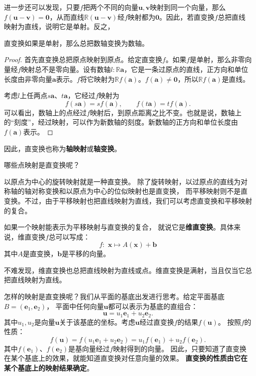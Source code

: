 \documentclass[12pt,UTF8,fontset=none]{ctexbook}
\begin{document}
进一步还可以发现，只要$f$把两个不同的向量$\mathbf{u}, \mathbf{v}$映射到同一个向量，那么$f(\mathbf{u}-\mathbf{v}) = \mathbf{0}$，从而直线$\mathbb{R}(\mathbf{u} - \mathbf{v})$经$f$映射都为$\mathbf{0}$。因此，若直变换$f$总把直线映射为直线，说明它是单射。反之，
\begin{tm}
    直变换如果是单射，那么总把数轴变换为数轴。
\end{tm}
\begin{proof}
    首先直变换总把原点映射到原点。给定直变换$f$。如果$f$是单射，那么非零向量经$f$映射总不是零向量。设有数轴$l: \mathbb{R}\mathbf{a}$，它是一条过原点的直线，正方向和单位长度由非零向量$\mathbf{a}$表示。$f$将它映射为$\mathbb{R}f(\mathbf{a})$。$f(\mathbf{a})\neq \mathbf{0}$，所以$\mathbb{R}f(\mathbf{a})$是直线。

    考虑$l$上任两点$s\mathbf{a}$、$t\mathbf{a}$，它经过$f$映射为
    $$ f(s\mathbf{a}) = sf(\mathbf{a}),\qquad f(t\mathbf{a}) = tf(\mathbf{a}).$$
    可以看出，数轴上的点经过$f$映射后，到原点距离之比不变。也就是说，数轴上的“刻度”，经过映射，可以作为新数轴的刻度。新数轴的正方向和单位长度由$f(\mathbf{a})$表示。
\end{proof}

因此，直变换也称为\textbf{轴映射}或\textbf{轴变换}。

哪些点映射是直变换呢？

以原点为中心的旋转映射就是一种直变换。
除了旋转映射，以过原点的直线为对称轴的轴对称变换和以原点为中心的位似映射也是直变换，
而平移映射则不是直变换。不过，由于平移映射也把直线映射为直线，我们可以考虑直变换和平移映射的复合。

\begin{df}
    如果一个映射能表示为平移映射与直变换的复合，
    就说它是\textbf{维直变换}。具体来说，维直变换$f$总可以写成：
    $$ f: \,\, \mathbf{x} \mapsto A(\mathbf{x}) + \mathbf{b} $$
    其中$A$是直变换，$\mathbf{b}$是平移的向量。
\end{df}
不难发现，维直变换也总把直线映射为直线或点。维直变换是满射，当且仅当它总把直线映射为直线。

怎样的映射是直变换呢？我们从平面的基底出发进行思考。给定平面基底$B = (\mathbf{e}_1, \mathbf{e}_2)$，
平面中任何向量$\mathbf{u}$都可以表示为基底的直组合：
$$ \mathbf{u} = u_1 \mathbf{e}_1 + u_2 \mathbf{e}_2.$$
其中$u_1, u_2$是向量$\mathbf{u}$关于该基底的坐标。考虑$\mathbf{u}$经过直变换$f$的结果$f(\mathbf{u})$。
按照$f$的性质：
$$ f(\mathbf{u}) = f(u_1 \mathbf{e}_1 + u_2 \mathbf{e}_2) = u_1 f(\mathbf{e}_1) + u_2 f(\mathbf{e}_2).$$
其中$f(\mathbf{e}_1)$、$f(\mathbf{e}_2)$是基向量经过$f$映射得到的向量。
因此，只要知道了直变换在某个基底上的效果，就能知道直变换对任意向量的效果。
\textbf{直变换的性质由它在某个基底上的映射结果确定}。
\end{document}
